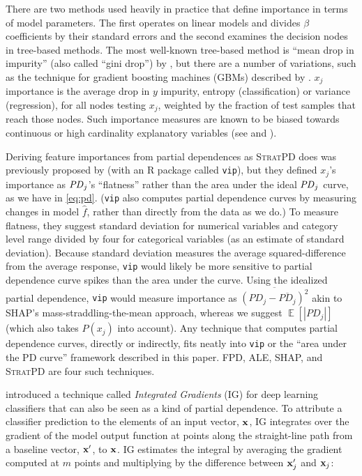 \documentclass[11pt]{article}
\DeclareMathOperator{\Ex}{\mathbb{E}}
\newcommand{\spd}{\fontfamily{cmr}\textsc{\small StratPD}}
\begin{document}
There are two methods used heavily in practice that define importance in terms of model parameters. The first operates on linear models and divides $\beta$ coefficients by their standard errors and the second examines the decision nodes in tree-based methods. The most well-known tree-based method is ``mean drop in impurity'' (also called ``gini drop'') by \cite{CART}, but there are a number of variations, such as the technique for gradient boosting machines (GBMs) described by \cite{PDP}. $x_j$ importance is the average drop in $y$ impurity, entropy (classification) or variance (regression), for all nodes testing $x_j$, weighted by the fraction of test samples that reach those nodes. Such importance measures are known to be biased towards continuous or high cardinality explanatory variables (see \citealt{permbias} and \citealt{RFunbiased}).

Deriving feature importances from partial dependences as \spd{} does was previously proposed by \cite{pdvim} (with an R package called {\tt vip}), but they defined $x_j$'s importance as ${\it PD}_j$'s ``flatness'' rather than the area under the ideal ${\it PD}_j$ curve, as we have in \eqref{eq:pd}.  ({\tt vip} also computes partial dependence curves by measuring changes in model $\hat{f}$, rather than directly from the data as we do.) To measure flatness, they suggest standard deviation for numerical variables and category level range divided by four for categorical variables (as an estimate of standard deviation).  Because standard deviation measures the average squared-difference from the average response, {\tt vip} would likely be more sensitive to partial dependence curve spikes than the area under the curve.  Using the idealized partial dependence, {\tt vip} would measure importance as $\overline{(PD_j - \overline{PD_j})^2}$ akin to SHAP's mass-straddling-the-mean approach, whereas we suggest $\Ex[|PD_j|]$ (which also takes $P(x_j)$ into account).  Any technique that computes partial dependence curves, directly or indirectly, fits neatly into {\tt vip} or the ``area under the PD curve'' framework described in this paper. FPD, ALE, SHAP, and \spd{} are four such techniques.

\citet{intgrad} introduced a technique called {\em Integrated Gradients} (IG) for deep learning classifiers that can also be seen as a kind of partial dependence. To attribute a classifier prediction to the elements of an input vector, $\bf x$, IG integrates over the gradient of the model output function at points along the straight-line path from a baseline vector, $\bf x'$, to $\bf x$. IG estimates the integral by averaging the gradient computed at $m$ points and multiplying by the difference between ${\bf x}'_j$ and ${\bf x}_j$:
\end{document}

